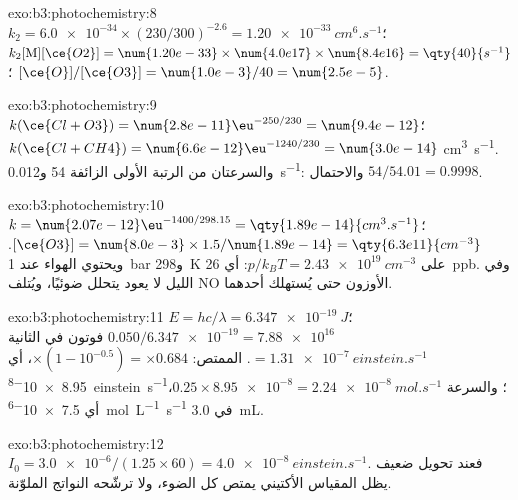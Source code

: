 \begin{solution}{exo:b3:photochemistry:8}
$k_2 = \num{6.0e-34} \times (230/300)^{-2.6} = \qty{1.20e-33}{cm^6.s^{-1}}$؛ $k_2[\mathrm M][\ce{O2}] = \num{1.20e-33} \times
\num{4.0e17} \times \num{8.4e16} = \qty{40}{s^{-1}}$؛ $[\ce{O}]/[\ce{O3}] = \num{1.0e-3}/40 = \num{2.5e-5}$.
\end{solution}

\begin{solution}{exo:b3:photochemistry:9}
$k(\ce{Cl + O3}) = \num{2.8e-11}\eu^{-250/230} = \num{9.4e-12}$؛ $k(\ce{Cl + CH4}) = \num{6.6e-12}\eu^{-1240/230} = \num{3.0e-14}$
\unit{cm^3.s^{-1}}. والسرعتان من الرتبة الأولى الزائفة 54 و\qty{0.012}{s^{-1}}: والاحتمال $54/54.01 = 0.9998$.
\end{solution}

\begin{solution}{exo:b3:photochemistry:10}
$k = \num{2.07e-12}\eu^{-1400/298.15} = \qty{1.89e-14}{cm^3.s^{-1}}$؛ $[\ce{O3}] = \num{8.0e-3} \times 1.5/\num{1.89e-14} =
\qty{6.3e11}{cm^{-3}}$. ويحتوي الهواء عند \qty{1}{bar} و\qty{298}{K} على $p/k_BT = \qty{2.43e19}{cm^{-3}}$: أي \qty{26}{ppb}. وفي الليل
لا يعود  يتحلل ضوئيًا، ويُتلف NO الأوزون حتى يُستهلك أحدهما.
\end{solution}

\begin{solution}{exo:b3:photochemistry:11}
$E = hc/\lambda = \qty{6.347e-19}{J}$؛ $0.050/\num{6.347e-19} = \num{7.88e16}$ فوتون في الثانية $= \qty{1.31e-7}{einstein.s^{-1}}$.
الممتص: $\times(1 - 10^{-0.5}) = \times0.684$، أي \qty{8.95e-8}{einstein.s^{-1}}؛ والسرعة $0.25 \times \num{8.95e-8} =
\qty{2.24e-8}{mol.s^{-1}}$، أي \qty{7.5e-6}{mol.L^{-1}.s^{-1}} في \qty{3.0}{mL}.
\end{solution}

\begin{solution}{exo:b3:photochemistry:12}
$I_0 = \num{3.0e-6}/(1.25 \times 60) = \qty{4.0e-8}{einstein.s^{-1}}$. فعند تحويل ضعيف يظل المقياس الأكتيني
يمتص كل الضوء، ولا ترشّحه النواتج الملوّنة.
\end{solution}

